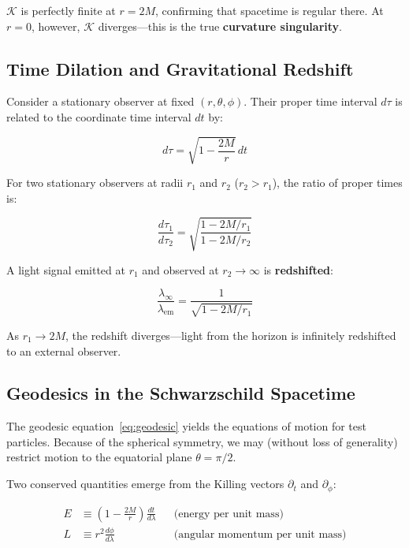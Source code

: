 \documentclass[12pt]{article}
\theoremstyle{definition}
\theoremstyle{remark}
\begin{document}
$\mathcal{K}$ is perfectly finite at $r = 2M$, confirming that spacetime is regular there. At $r = 0$, however, $\mathcal{K}$ diverges---this is the true \textbf{curvature singularity}.

\subsection{Time Dilation and Gravitational Redshift}

Consider a stationary observer at fixed $(r,\theta,\phi)$. Their proper time interval $d\tau$ is related to the coordinate time interval $dt$ by:

\begin{equation}
  d\tau = \sqrt{1 - \frac{2M}{r}}\,dt
\end{equation}

For two stationary observers at radii $r_{1}$ and $r_{2}$ ($r_{2} > r_{1}$), the ratio of proper times is:

\begin{equation}
  \frac{d\tau_{1}}{d\tau_{2}} = \sqrt{\frac{1 - 2M/r_{1}}{1 - 2M/r_{2}}}
\end{equation}

A light signal emitted at $r_{1}$ and observed at $r_{2} \to \infty$ is \textbf{redshifted}:

\begin{equation}\label{eq:redshift}
  \frac{\lambda_{\infty}}{\lambda_{\text{em}}} = \frac{1}{\sqrt{1 - 2M/r_{1}}}
\end{equation}

As $r_{1} \to 2M$, the redshift diverges---light from the horizon is infinitely redshifted to an external observer.

\subsection{Geodesics in the Schwarzschild Spacetime}

The geodesic equation~\eqref{eq:geodesic} yields the equations of motion for test particles. Because of the spherical symmetry, we may (without loss of generality) restrict motion to the equatorial plane $\theta = \pi/2$.

Two conserved quantities emerge from the Killing vectors $\partial_{t}$ and $\partial_{\phi}$:

\begin{align}
  E &\equiv \left(1 - \frac{2M}{r}\right)\frac{dt}{d\lambda}
      &&\text{(energy per unit mass)} \\[4pt]
  L &\equiv r^{2}\frac{d\phi}{d\lambda}
      &&\text{(angular momentum per unit mass)}
\end{align}
\end{document}
